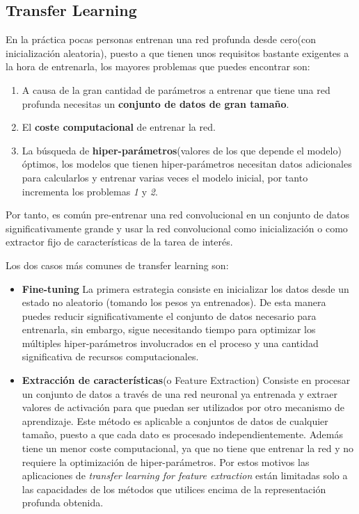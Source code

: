 \documentclass[12,twoside]{TFG-GM}
\theoremstyle{definition}
\theoremstyle{remark}
\begin{document}
\newpage
\subsection{Transfer Learning}

En la práctica pocas personas entrenan una red profunda desde cero(con inicialización aleatoria), puesto a que tienen unos requisitos bastante exigentes a la hora de entrenarla, los mayores problemas que puedes encontrar son: 
\begin{enumerate}
\item A causa de la gran cantidad de parámetros a entrenar que tiene una red profunda necesitas un \textbf{conjunto de datos de gran tamaño}.
\item El \textbf{coste computacional} de entrenar la red. 
\item La búsqueda de \textbf{hiper-parámetros}(valores de los que depende el modelo) óptimos, los modelos que tienen hiper-parámetros necesitan datos adicionales para calcularlos y entrenar varias veces el modelo inicial, por tanto incrementa los problemas \textit{1} y \textit{2}.
\end{enumerate}
Por tanto, es común pre-entrenar una red convolucional en un conjunto de datos significativamente grande y usar la red convolucional como inicialización o como extractor fijo de características de la tarea de interés. 

Los dos casos más comunes de transfer learning son: 

\begin{itemize}
\item \textbf{Fine-tuning} La primera estrategia consiste en inicializar los datos desde un estado no aleatorio (tomando los pesos ya entrenados). 
De esta manera puedes reducir significativamente el conjunto de datos necesario para entrenarla, sin embargo, sigue necesitando tiempo para optimizar los múltiples hiper-parámetros involucrados en el proceso y una cantidad significativa de recursos computacionales. 


\item\textbf{Extracción de características}(o Feature Extraction)  Consiste en procesar un conjunto de datos a través de una red neuronal ya entrenada y extraer valores de activación para que puedan ser utilizados por otro mecanismo de aprendizaje. Este método es aplicable a conjuntos de datos de cualquier tamaño, puesto a que cada dato es procesado independientemente. Además tiene un menor coste computacional, ya que no tiene que entrenar la red y no requiere la optimización de hiper-parámetros. Por estos motivos las aplicaciones de \textit{transfer learning for feature extraction} están limitadas solo a las  capacidades de los métodos que utilices encima de la representación profunda obtenida. 


\end{itemize}
\end{document}
